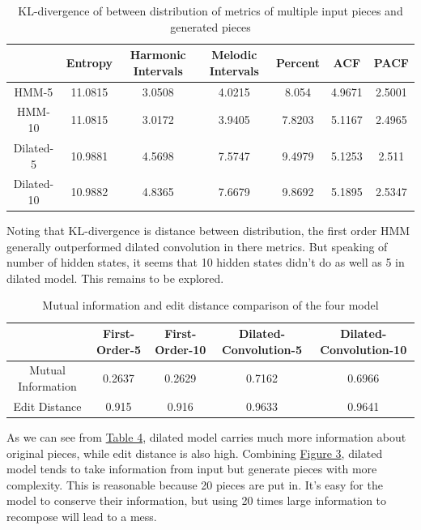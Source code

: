 \documentclass[10pt, oneside]{article}
\begin{document}
\begin{table}[H]
\centering
\begin{tabular}{|c|c|c|c|c|c|c|}
\hline
           & Entropy & Harmonic Intervals & Melodic Intervals & Percent & ACF    & PACF   \\ \hline
HMM-5      & 11.0815 & 3.0508  & 4.0215  & 8.054   & 4.9671 & 2.5001 \\ \hline
HMM-10     & 11.0815 & 3.0172  & 3.9405  & 7.8203  & 5.1167 & 2.4965 \\ \hline
Dilated-5  & 10.9881 & 4.5698  & 7.5747  & 9.4979  & 5.1253 & 2.511  \\ \hline
Dilated-10 & 10.9882 & 4.8365  & 7.6679  & 9.8692  & 5.1895 & 2.5347 \\ \hline
\end{tabular}
\caption{KL-divergence of between distribution of metrics of multiple input pieces and generated pieces}
\label{table: multiple metrics}
\end{table}
Noting that KL-divergence is distance between distribution, the first order HMM generally outperformed dilated convolution in there metrics. But speaking of number of hidden states, it seems that 10 hidden states didn't do as well as 5 in dilated model. This remains to be explored. 

\begin{table}[H]
\centering
\begin{tabular}{|c|c|c|c|c|}
\hline
                   & First-Order-5 & First-Order-10 & Dilated-Convolution-5 & Dilated-Convolution-10 \\ \hline
Mutual Information & 0.2637        & 0.2629         & 0.7162                & 0.6966                 \\ \hline
Edit Distance      & 0.915         & 0.916          & 0.9633                & 0.9641                 \\ \hline
\end{tabular}
\caption{Mutual information and edit distance comparison of the four model}
\label{table:mued}
\end{table}
As we can see from \hyperref[table:mued]{Table 4}, dilated model carries much more information about original pieces, while edit distance is also high. Combining \hyperref[fig:mued]{Figure 3}, dilated model tends to take information from input but generate pieces with more complexity. This is reasonable because 20 pieces are put in. It's easy for the model to conserve their information, but using 20 times large information to recompose will lead to a mess. 
\end{document}
